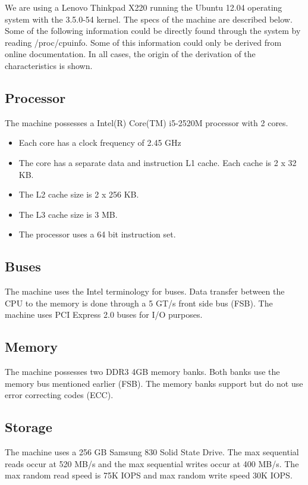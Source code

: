 We are using a Lenovo Thinkpad X220 running the Ubuntu 12.04 operating system with the 3.5.0-54 kernel. The specs of the machine are described below. Some of the following information could be directly found through the system by reading /proc/cpuinfo. Some of this information could only be derived from online documentation. In all cases, the origin of the derivation of the characteristics is shown.

\subsection{Processor}
The machine possesses a Intel(R) Core(TM) i5-2520M processor with 2 cores. 

\begin{itemize}
    \item{Each core has a clock frequency of 2.45 GHz}
    \item{The core has a separate data and instruction L1 cache. Each cache is 2 x 32 KB.}
\item{The L2 cache size is 2 x 256 KB.}
\item{The L3 cache size is 3 MB.}
\item{The processor uses a 64 bit instruction set.}
\end{itemize}

\subsection{Buses}

The machine uses the Intel terminology for buses. Data transfer between the CPU to the memory is done through a 5 GT/s front side bus (FSB). The machine uses PCI Express 2.0 buses for I/O purposes.

\subsection{Memory}

The machine possesses two DDR3 4GB memory banks. Both banks use the memory bus mentioned earlier (FSB). The memory banks support but do not use error correcting codes (ECC). 

\subsection{Storage}

The machine uses a 256 GB Samsung 830 Solid State Drive. The max sequential
reads occur at 520 MB/s and the max sequential writes occur at 400 MB/s. The max random read speed is 75K IOPS and max random write speed 30K IOPS. 

